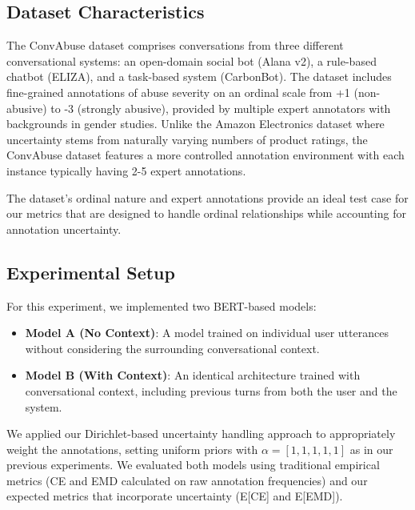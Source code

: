 \documentclass[journal]{IEEEtran}
\begin{document}
\subsection{Dataset Characteristics}

The ConvAbuse dataset comprises conversations from three different conversational systems: an open-domain social bot (Alana v2), a rule-based chatbot (ELIZA), and a task-based system (CarbonBot). The dataset includes fine-grained annotations of abuse severity on an ordinal scale from +1 (non-abusive) to -3 (strongly abusive), provided by multiple expert annotators with backgrounds in gender studies. Unlike the Amazon Electronics dataset where uncertainty stems from naturally varying numbers of product ratings, the ConvAbuse dataset features a more controlled annotation environment with each instance typically having 2-5 expert annotations.

The dataset's ordinal nature and expert annotations provide an ideal test case for our metrics that are designed to handle ordinal relationships while accounting for annotation uncertainty.

\subsection{Experimental Setup}

For this experiment, we implemented two BERT-based models:

\begin{itemize}
    \item \textbf{Model A (No Context)}: A model trained on individual user utterances without considering the surrounding conversational context.
    
    \item \textbf{Model B (With Context)}: An identical architecture trained with conversational context, including previous turns from both the user and the system.
\end{itemize}

We applied our Dirichlet-based uncertainty handling approach to appropriately weight the annotations, setting uniform priors with $\alpha = [1,1,1,1,1]$ as in our previous experiments. We evaluated both models using traditional empirical metrics (CE and EMD calculated on raw annotation frequencies) and our expected metrics that incorporate uncertainty (E[CE] and E[EMD]).
\end{document}
